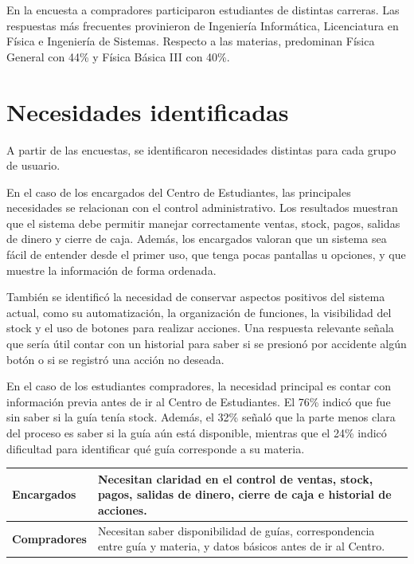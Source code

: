 \documentclass[12pt,letterpaper]{article}
\begin{document}
En la encuesta a compradores participaron estudiantes de distintas carreras. Las respuestas más frecuentes provinieron de Ingeniería Informática, Licenciatura en Física e Ingeniería de Sistemas. Respecto a las materias, predominan Física General con 44\% y Física Básica III con 40\%.

\section{Necesidades identificadas}

A partir de las encuestas, se identificaron necesidades distintas para cada grupo de usuario.

En el caso de los encargados del Centro de Estudiantes, las principales necesidades se relacionan con el control administrativo. Los resultados muestran que el sistema debe permitir manejar correctamente ventas, stock, pagos, salidas de dinero y cierre de caja. Además, los encargados valoran que un sistema sea fácil de entender desde el primer uso, que tenga pocas pantallas u opciones, y que muestre la información de forma ordenada.

También se identificó la necesidad de conservar aspectos positivos del sistema actual, como su automatización, la organización de funciones, la visibilidad del stock y el uso de botones para realizar acciones. Una respuesta relevante señala que sería útil contar con un historial para saber si se presionó por accidente algún botón o si se registró una acción no deseada.

En el caso de los estudiantes compradores, la necesidad principal es contar con información previa antes de ir al Centro de Estudiantes. El 76\% indicó que fue sin saber si la guía tenía stock. Además, el 32\% señaló que la parte menos clara del proceso es saber si la guía aún está disponible, mientras que el 24\% indicó dificultad para identificar qué guía corresponde a su materia.

\begin{center}
\begin{tabularx}{\textwidth}{|>{\bfseries}p{5cm}|X|}
\hline
Encargados & Necesitan claridad en el control de ventas, stock, pagos, salidas de dinero, cierre de caja e historial de acciones. \\
\hline
Compradores & Necesitan saber disponibilidad de guías, correspondencia entre guía y materia, y datos básicos antes de ir al Centro. \\
\hline
\end{tabularx}
\end{center}
\end{document}

